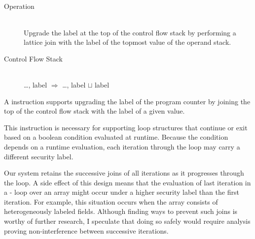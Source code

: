 


\subsection{\join}
\label{sec:join-cflabel}

\begin{samepage}
\begin{description}
\item[Operation] \hfill \\
 Upgrade the label at the top of the control flow stack by performing a lattice join with the label of the topmost value of the operand stack.
\item[Control Flow Stack] \hfill \\
 \ldots, label $\Rightarrow$ \ldots, label $\sqcup$ label
\end{description}
\end{samepage}

A \join instruction supports upgrading the label of the program counter by joining the top of the control flow stack with the label of a given value.

This instruction is necessary for supporting loop structures that continue or exit based on a boolean condition evaluated at runtime.
Because the condition depends on a runtime evaluation, each iteration through the loop may carry a different security label.

Our system retains the successive joins of all iterations as it progresses through the loop.
A side effect of this design means that the evaluation of last iteration in a - loop over an array might occur under a higher security label than the first iteration.
For example, this situation occurs when the array consists of heterogeneously labeled fields.
Although finding ways to prevent such joins is worthy of further research, I speculate that doing so safely would require analysis proving non-interference between successive iterations.

